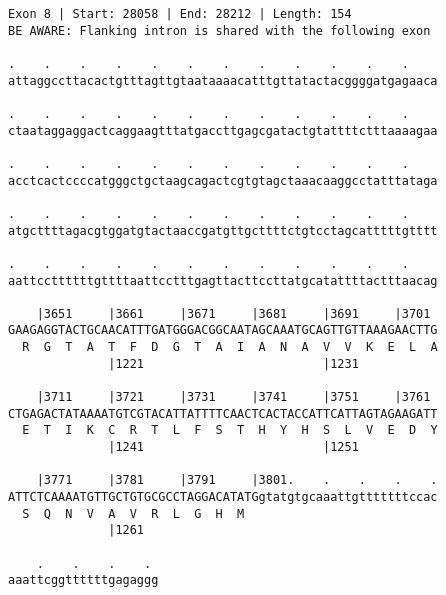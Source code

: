 \documentclass{article}
\begin{document}
\begin{Verbatim}
Exon 8 | Start: 28058 | End: 28212 | Length: 154
BE AWARE: Flanking intron is shared with the following exon
 
.    .    .    .    .    .    .    .    .    .    .    .    
attaggccttacactgtttagttgtaataaaacatttgttatactacggggatgagaaca
  
.    .    .    .    .    .    .    .    .    .    .    .    
ctaataggaggactcaggaagtttatgaccttgagcgatactgtattttctttaaaagaa
  
.    .    .    .    .    .    .    .    .    .    .    .    
acctcactccccatgggctgctaagcagactcgtgtagctaaacaaggcctatttataga
  
.    .    .    .    .    .    .    .    .    .    .    .    
atgcttttagacgtggatgtactaaccgatgttgcttttctgtcctagcatttttgtttt
  
.    .    .    .    .    .    .    .    .    .    .    .    
aattccttttttgttttaattcctttgagttacttccttatgcatattttactttaacag
  
    |3651     |3661     |3671     |3681     |3691     |3701 
GAAGAGGTACTGCAACATTTGATGGGACGGCAATAGCAAATGCAGTTGTTAAAGAACTTG
  R  G  T  A  T  F  D  G  T  A  I  A  N  A  V  V  K  E  L  A
              |1221                         |1231           
  
    |3711     |3721     |3731     |3741     |3751     |3761 
CTGAGACTATAAAATGTCGTACATTATTTTCAACTCACTACCATTCATTAGTAGAAGATT
  E  T  I  K  C  R  T  L  F  S  T  H  Y  H  S  L  V  E  D  Y
              |1241                         |1251           
  
    |3771     |3781     |3791     |3801.    .    .    .    .
ATTCTCAAAATGTTGCTGTGCGCCTAGGACATATGgtatgtgcaaattgtttttttccac
  S  Q  N  V  A  V  R  L  G  H  M                           
              |1261                                         
  
    .    .    .    . 
aaattcggttttttgagaggg
\end{Verbatim}
\newpage
\end{document}
